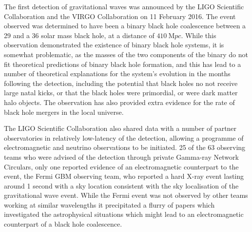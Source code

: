 The first detection of gravitational waves was announced by the LIGO
Scientific Collaboration and the VIRGO Collaboration on 11 February
2016\cite{2016PhRvL.116f1102A,2016arXiv160203843T,2016arXiv160203839T}. The
event observed was determined to have been a binary black hole
coalescence between a 29 and a 36 solar mass black hole, at a distance
of $\SI{410}{\mega pc}$\cite{2016arXiv160203840T}. While this
observation demonstrated the existence of binary black hole
systems\cite{2016ApJ...818L..22A}, it is somewhat problematic, as the
masses of the two components of the binary do not fit theoretical
predictions of binary black hole formation, and this has lead to a
number of theoretical explanations for the system's evolution in the
months following the detection, including the potential that black
holes no not receive large natal kicks\cite{2016arXiv160204531B}, or
that the black holes were primordial\cite{2016arXiv160308338S}, or
were dark matter halo objects\cite{2016arXiv160300464B}. The
observation has also provided extra evidence for the rate of black
hole mergers in the local universe\cite{2016arXiv160203842A}.

The LIGO Scientific Collaboration also shared data with a number of
partner observatories in relatively low-latency of the detection,
allowing a programme of
electromagnetic\cite{2016arXiv160208492A,2016arXiv160407864A} and
neutrino\cite{2016arXiv160205411A} observations to be initiated. 25 of
the 63 observing teams who were advised of the detection through
private Gamma-ray Network Circulars, only one reported evidence of an
electromagnetic counterpart to the event, the Fermi GBM observing
team\cite{2016arXiv160203920C}, who reported a hard X-ray event
lasting around 1 second with a sky location consistent with the sky
localisation of the gravitational wave event. While the Fermi event
was not observed by other teams working at similar
wavelengths\cite{2016ApJ...820L..36S,2016arXiv160204488F,2016MNRAS.tmpL..45E}
it precipitated a flurry of papers which investigated the
astrophysical situations which might lead to an electromagnetic
counterpart of a black hole
coalescence\cite{2016ApJ...819L..21L,2016arXiv160407132J}.

